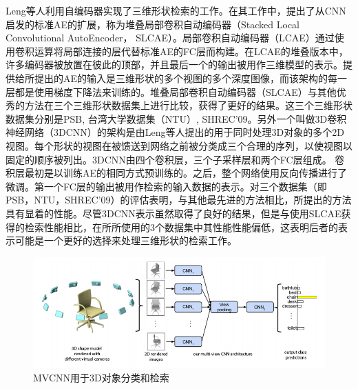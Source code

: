 \documentclass[twoside,UTF8]{nputhesis}
\begin{document}
Leng等人\cite{}利用自编码器实现了三维形状检索的工作。在其工作中，提出了从CNN启发的标准AE的扩展，称为堆叠局部卷积自动编码器（Stacked Local Convolutional AutoEncoder， SLCAE）。局部卷积自动编码器（LCAE）通过使用卷积运算将局部连接的层代替标准AE的FC层而构建。在LCAE的堆叠版本中，许多编码器被放置在彼此的顶部，并且最后一个的输出被用作三维模型的表示。提供给所提出的AE的输入是三维形状的多个视图的多个深度图像，而该架构的每一层都是使用梯度下降法来训练的。堆叠局部卷积自动编码器（SLCAE）与其他优秀的方法在三个三维形状数据集上进行比较，获得了更好的结果。这三个三维形状数据集分别是PSB\cite{}, 台湾大学数据集（NTU）\cite{}, SHREC'09\cite{}。另外一个叫做3D卷积神经网络（3DCNN）的架构是由Leng等人提出的\cite{}用于同时处理3D对象的多个2D视图。每个形状的视图在被馈送到网络之前被分类成三个合理的序列，以使视图以固定的顺序被列出。3DCNN由四个卷积层，三个子采样层和两个FC层组成。 卷积层最初是以训练AE的相同方式预训练的。之后，整个网络使用反向传播进行了微调。第一个FC层的输出被用作检索的输入数据的表示。对三个数据集（即PSB，NTU，SHREC'09）的评估表明，与其他最先进的方法相比，所提出的方法具有显着的性能。尽管3DCNN表示虽然取得了良好的结果，但是与使用SLCAE获得的检索性能相比，在所所使用的3个数据集中其性能性能偏低，这表明后者的表示可能是一个更好的选择来处理三维形状的检索工作。
\begin{figure}[tb]
\begin{center}
\includegraphics[width=0.9\linewidth]{figures/Su.jpg} 
\end{center} 
\vspace{-4mm}
\caption{MVCNN用于3D对象分类和检索} 
\label{fig_Su}
\end{figure}
\end{document}
